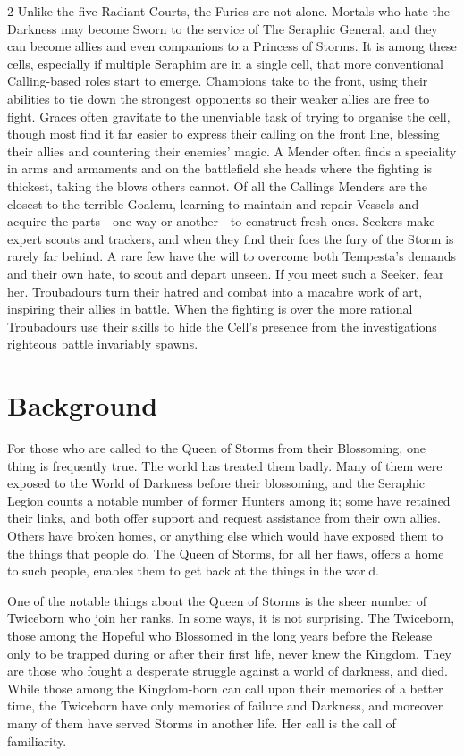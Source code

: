 \begin{multicols}{2}
Unlike the five Radiant Courts, the Furies are not alone. Mortals who hate the Darkness may become Sworn to the service of The Seraphic General, and they can become allies and even companions to a Princess of Storms. It is among these cells, especially if multiple Seraphim are in a single cell, that more conventional Calling-based roles start to emerge. Champions take to the front, using their abilities to tie down the strongest opponents so their weaker allies are free to fight. Graces often gravitate to the unenviable task of trying to organise the cell, though most find it far easier to express their calling on the front line, blessing their allies and countering their enemies' magic. A Mender often finds a speciality in arms and armaments and on the battlefield she heads where the fighting is thickest, taking the blows others cannot. Of all the Callings Menders are the closest to the terrible Goalenu, learning to maintain and repair Vessels and acquire the parts - one way or another - to construct fresh 
ones. Seekers make expert scouts and trackers, and when they find their foes the fury of the Storm is rarely far behind. A rare few have the will to overcome both Tempesta's demands and their own hate, to scout and depart unseen. If you meet such a Seeker, fear her. Troubadours turn their hatred and combat into a macabre work of art, inspiring their allies in battle. When the fighting is over the more rational Troubadours use their skills to hide the Cell's presence from the investigations righteous battle invariably spawns.

\section*{Background}
For those who are called to the Queen of Storms from their Blossoming, one thing is frequently true. The world has treated them badly. Many of them were exposed to the World of Darkness before their blossoming, and the Seraphic Legion counts a notable number of former Hunters among it; some have retained their links, and both offer support and request assistance from their own allies. Others have broken homes, or anything else which would have exposed them to the things that people do. The Queen of Storms, for all her flaws, offers a home to such people, enables them to get back at the things in the world.

One of the notable things about the Queen of Storms is the sheer number of Twiceborn who join her ranks. In some ways, it is not surprising. The Twiceborn, those among the Hopeful who Blossomed in the long years before the Release only to be trapped during or after their first life, never knew the Kingdom. They are those who fought a desperate struggle against a world of darkness, and died. While those among the Kingdom-born can call upon their memories of a better time, the Twiceborn have only memories of failure and Darkness, and moreover many of them have served Storms in another life. Her call is the call of familiarity.


\end{multicols}
